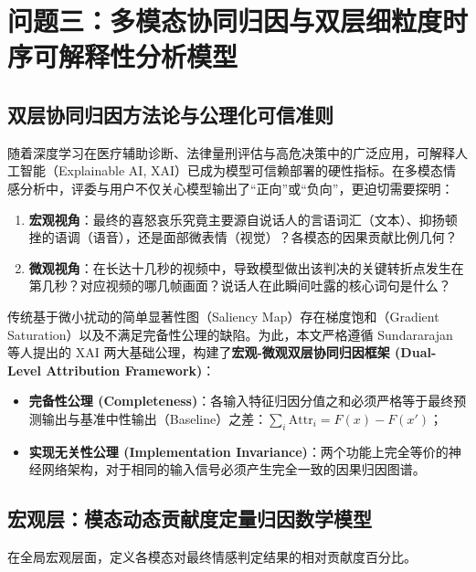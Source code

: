\section{问题三：多模态协同归因与双层细粒度时序可解释性分析模型}

\subsection{双层协同归因方法论与公理化可信准则}
随着深度学习在医疗辅助诊断、法律量刑评估与高危决策中的广泛应用，可解释人工智能（Explainable AI, XAI）已成为模型可信赖部署的硬性指标。在多模态情感分析中，评委与用户不仅关心模型输出了“正向”或“负向”，更迫切需要探明：
\begin{enumerate}
    \item \textbf{宏观视角}：最终的喜怒哀乐究竟主要源自说话人的言语词汇（文本）、抑扬顿挫的语调（语音），还是面部微表情（视觉）？各模态的因果贡献比例几何？
    \item \textbf{微观视角}：在长达十几秒的视频中，导致模型做出该判决的关键转折点发生在第几秒？对应视频的哪几帧画面？说话人在此瞬间吐露的核心词句是什么？
\end{enumerate}

传统基于微小扰动的简单显著性图（Saliency Map）存在梯度饱和（Gradient Saturation）以及不满足完备性公理的缺陷。为此，本文严格遵循 Sundararajan 等人\cite{sundararajan2017axiomatic}提出的 XAI 两大基础公理，构建了\textbf{宏观-微观双层协同归因框架 (Dual-Level Attribution Framework)}：
\begin{itemize}
    \item \textbf{完备性公理 (Completeness)}：各输入特征归因分值之和必须严格等于最终预测输出与基准中性输出（Baseline）之差：$\sum_i \text{Attr}_i = F(x) - F(x') $；
    \item \textbf{实现无关性公理 (Implementation Invariance)}：两个功能上完全等价的神经网络架构，对于相同的输入信号必须产生完全一致的因果归因图谱。
\end{itemize}

\subsection{宏观层：模态动态贡献度定量归因数学模型}
在全局宏观层面，定义各模态对最终情感判定结果的相对贡献度百分比。

